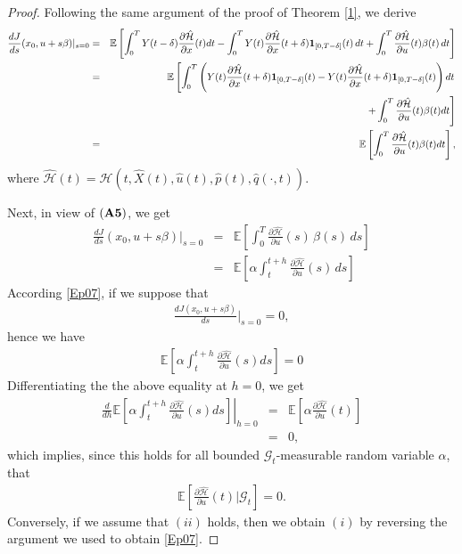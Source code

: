 \documentclass[12pt]{article}
\theoremstyle{remark}
\numberwithin{equation}{section}
\def\E{\mathbb E}
\def\E{\mathbb E}
\begin{document}
\begin{proof}
Following the same argument of the proof of Theorem \ref{1}, we derive
\begin{eqnarray*}
\frac{dJ}{ds}(x_0,u+s\beta)|_{s=0}&=&	\E \left[ 
	\int_{0}^{T} Y(t-\delta)\frac{\partial \hat{\mathcal{H}}}{\partial x}(t)dt -\int_{0}^{T} Y(t)\frac{\partial \hat{\mathcal{H}}}{\partial x}(t+\delta)\mathbf{1}_{[0,T-\delta]}(t) \, dt + \int_{0}^{T} \frac{\partial \hat{\mathcal{H}}}{\partial u}(t) \beta(t)  \,dt 
	\right]\\
	&=& \E\left[\int_{0}^{T}\left(Y(t)\frac{\partial \hat{\mathcal{H}}}{\partial x}(t+\delta){\bf1}_{[0,T-\delta]}(t) - Y(t)\frac{\partial \hat{\mathcal{H}}}{\partial x}(t+\delta)\mathbf{1}_{[0,T-\delta]}(t) \right)dt\right.\\
	&&\left.+ \int_{0}^{T} \frac{\partial \hat{\mathcal{H}}}{\partial u}(t) \beta(t) dt\right]\\ 
	&=& \E\left[\int_{0}^{T} \frac{\partial \hat{\mathcal{H}}}{\partial u}(t) \beta(t) dt\right],
\end{eqnarray*}
where $\hat{\mathcal{H}}(t)=\mathcal{H}\left(t,\hat{X}(t), \hat{u}(t), \hat{p}(t), \hat{q}(\cdot,t) \right)$.

Next, in view of $({\bf A5})$, we get
\begin{eqnarray}\label{Ep07}
\frac{dJ}{ds}(x_0,u+s\beta)|_{s=0} 
&=& \mathbb{E}\left[ \int_0^T \frac{\partial \hat{\mathcal{H}}}{\partial u}(s)\, \beta(s)\, ds \right] \nonumber\\
&=& \mathbb{E} \left[ \alpha \int_t^{t+h} \frac{\partial \hat{\mathcal{H}}}{\partial u}(s)\, ds\right]
\end{eqnarray}
According \eqref{Ep07}, if we suppose that
\begin{eqnarray}\label{Ep08}
\frac{dJ(x_0,u+s\beta)}{ds}|_{s=0} = 0,
\end{eqnarray}
hence we have 
\begin{eqnarray*}
\mathbb{E} \left[ \alpha \int_t^{t+h} \frac{\partial \hat{\mathcal{H}}}{\partial u}(s)ds\right]=0
\end{eqnarray*}
Differentiating the the above equality at $h=0$, we get
\begin{eqnarray*}
\left.\frac{d}{dh}\mathbb{E}\left[\alpha \int_{t}^{t+h}\frac{\partial \hat{\mathcal{H}}}{\partial u}(s)ds\right]\right|_{h=0}&=&
\mathbb{E}\left[\alpha \frac{\partial \hat{\mathcal{H}}}{\partial u}(t)\right]\\
&=&0,
\end{eqnarray*}
which implies, since this holds for all bounded $\mathcal{G}_t$-measurable random variable $\alpha$, that
\begin{eqnarray*}
\mathbb{E}\left[\frac{\partial \hat{\mathcal{H}}}{\partial u}(t)|\mathcal{G}_t \right] = 0.
\end{eqnarray*}
Conversely, if we assume that $(ii)$ holds, then we obtain $(i)$ by reversing the argument we used to obtain \eqref{Ep07}.
\end{proof}
\end{document}
